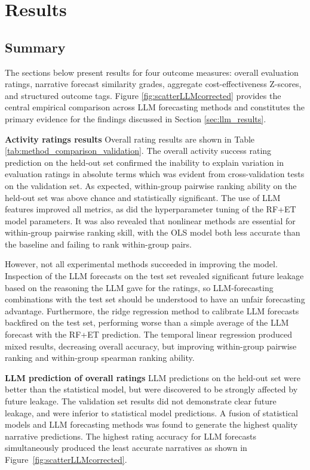 \section{Results}
\subsection{Summary}
The sections below present results for four outcome measures: overall evaluation ratings, narrative forecast similarity grades, aggregate cost-effectiveness Z-scores, and structured outcome tags. Figure \ref{fig:scatterLLMcorrected} provides the central empirical comparison across LLM forecasting methods and constitutes the primary evidence for the findings discussed in Section \ref{sec:llm_results}.

\textbf{Activity ratings results} Overall rating results are shown in Table \ref{tab:method_comparison_validation}. The overall activity success rating prediction on the held-out set confirmed the inability to explain variation in evaluation ratings in absolute terms which was evident from cross-validation tests on the validation set. As expected, within-group pairwise ranking ability on the held-out set was above chance and statistically significant. The use of LLM features improved all metrics, as did the hyperparameter tuning of the RF+ET model parameters. It was also revealed that nonlinear methods are essential for within-group pairwise ranking skill, with the OLS model both less accurate than the baseline and failing to rank within-group pairs. 

However, not all experimental methods succeeded in improving the model. Inspection of the LLM forecasts on the test set revealed significant future leakage based on the reasoning the LLM gave for the ratings, so LLM-forecasting combinations with the test set should be understood to have an unfair forecasting advantage. Furthermore, the ridge regression method to calibrate LLM forecasts backfired on the test set, performing worse than a simple average of the LLM forecast with the RF+ET prediction. The temporal linear regression produced mixed results, decreasing overall accuracy, but improving within-group pairwise ranking and within-group spearman ranking ability.

\textbf{LLM prediction of overall ratings} LLM predictions on the held-out set were better than the statistical model, but were discovered to be strongly affected by future leakage. The validation set results did not demonstrate clear future leakage, and were inferior to statistical model predictions. A fusion of statistical models and LLM forecasting methods was found to generate the highest quality narrative predictions. The highest rating accuracy for LLM forecasts simultaneously produced the least accurate narratives as shown in Figure~\ref{fig:scatterLLMcorrected}. 


